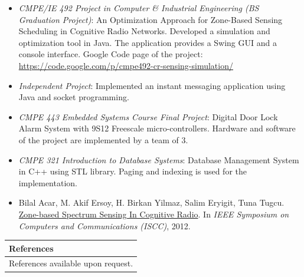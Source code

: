 \documentclass[11pt]{article}
\begin{document}
\begin{itemize}
\item \textit{CMPE/IE 492 Project in Computer \& Industrial Engineering (BS Graduation Project)}: An Optimization Approach for Zone-Based Sensing Scheduling in Cognitive Radio Networks. Developed a simulation and optimization tool in Java. The application provides a Swing GUI and a console interface. Google Code page of the project: \url{https://code.google.com/p/cmpe492-cr-sensing-simulation/}
\item \textit{Independent Project}: Implemented an instant messaging application using Java and socket programming.
\item \textit{CMPE 443 Embedded Systems Course Final Project}: Digital Door Lock Alarm System with 9S12 Freescale micro-controllers. Hardware and software of the project are implemented by a team of 3.
\item \textit{CMPE 321 Introduction to Database Systems}: Database Management System in C++ using STL library. Paging and indexing is used for the implementation.
\item Bilal Acar, M. Akif Ersoy, H. Birkan Yilmaz, Salim Eryigit, Tuna Tugcu. \href{http://www.computer.org/csdl/proceedings/iscc/2012/2712/00/IS273.pdf}{Zone-based Spectrum Sensing In Cognitive Radio}. In \textit{IEEE Symposium on Computers and Communications (ISCC)}, 2012.
\end{itemize}

\begin{tabular}{p{18cm}}
\textbf{References} \\
\hline
\vspace{0.2cm}
References available upon request.
\end{tabular}
\end{document}

